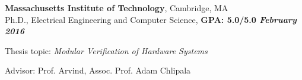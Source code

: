 \documentclass[margin,line]{resume}
\begin{document}
\begin{resume}
    \textbf{Massachusetts Institute of Technology}, Cambridge, MA \\
    \vspace{-2mm}
    Ph.D., Electrical Engineering and Computer Science, \hfill \textbf{GPA: 5.0/5.0 \textit{February 2016}}\\
    \vspace{-2mm}
    \begin{list2}
        \item Thesis topic: \textit{Modular Verification of Hardware Systems}
        \item Advisor:  Prof. Arvind, Assoc. Prof. Adam Chlipala


\end{list2}
\end{resume}
\end{document}
